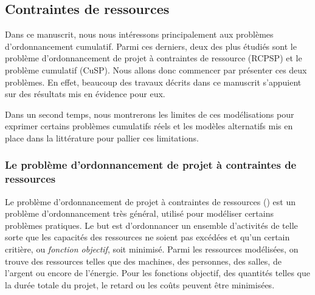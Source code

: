 
\subsection{Contraintes de ressources}
\label{sec:ordo_res}
Dans ce manuscrit, nous nous intéressons  principalement  aux problèmes
d'ordonnancement cumulatif. Parmi ces derniers, deux des plus
étudiés sont le problème d'ordonnancement de projet à contraintes de
ressource (RCPSP) et le problème cumulatif (CuSP). Nous allons donc
commencer par présenter ces deux problèmes. En effet, beaucoup des
travaux décrits dans ce manuscrit s'appuient sur des résultats mis en
évidence pour eux. 

Dans un second temps, nous montrerons les limites de ces modélisations
pour exprimer certains problèmes cumulatifs réels et
les modèles alternatifs mis en place dans la littérature pour pallier ces
limitations.

\subsubsection{Le problème d'ordonnancement de projet à contraintes de 
ressources}

Le problème d'ordonnancement de projet à contraintes de ressources
(\RCPSP) est un problème d'ordonnancement très général, utilisé pour
modéliser certains problèmes pratiques. Le but est
d'ordonnancer un ensemble d'activités de telle sorte que les capacités
des ressources ne soient pas excédées et qu'un certain critière, ou
{\it  fonction objectif}, soit minimisé. Parmi les ressources
modélisées, on trouve des ressources telles que des machines, des
personnes, des salles, de l'argent ou encore de l'énergie. Pour les
fonctions objectif, des quantités telles que la durée totale du
projet, le retard ou les coûts peuvent être minimisées.

